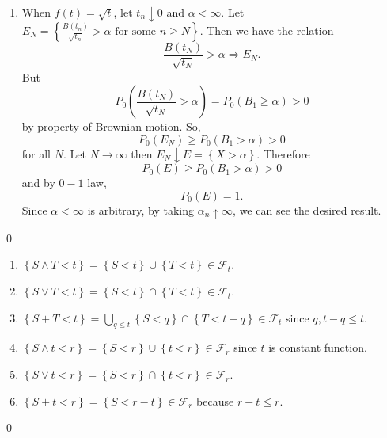 \begin{problem}[7.2.4]
\begin{enumerate}
\item When $f(t) = \sqrt{t}$, let $t_n \downarrow 0$ and $\alpha < \infty$.
	Let $E_N = \left\{ \frac{B(t_n)}{\sqrt{t_n}} > \alpha \text{ for some } n \ge N \right\}$.
	Then we have the relation
	\[
		\frac{B(t_N)}{\sqrt{t_N}} > \alpha \Rightarrow E_N.
	\]
	But
	\[
		P_0\left( \frac{B(t_N)}{\sqrt{t_N}} > \alpha \right)
		= P_0\left( B_1 \ge \alpha \right) > 0
	\]
	by property of Brownian motion.
	So,
	\[
		P_0(E_N) \ge P_0(B_1 > \alpha) > 0
	\]
	for all $N$.
	Let $N \rightarrow \infty$ then $E_N \downarrow E = \left\{ X > \alpha \right\}$.
	Therefore
	\[
		P_0(E) \ge P_0(B_1 > \alpha) > 0
	\]
	and by $0-1$ law,
	\[
		P_0(E) = 1.
	\]
	Since $\alpha < \infty$ is arbitrary, by taking $\alpha_n \uparrow \infty$, we can see the desired result.
\end{enumerate}

	\qed
\end{problem}

\begin{problem}[7.3.2] \hfill

	\begin{enumerate}
		\item $\left\{ S \wedge T < t \right\} = \left\{ S < t  \right\} \cup \left\{ T < t \right\} \in \mathcal{F}_t$.

		\item $\left\{ S \vee T < t \right\} = \left\{ S < t \right\} \cap \left\{ T < t \right\} \in \mathcal{F}_t$.
	
		\item $\left\{ S + T < t \right \} = \bigcup_{q \le t} \left\{ S < q \right\} \cap \left\{ T< t-q \right\} \in \mathcal{F}_t$ since $q , t-q \le t$.

		\item $\left\{ S \wedge t < r \right\} = \left\{ S < r \right\} \cup \left\{ t < r \right\} \in \mathcal{F}_r$ since $t$ is constant function.

		\item $\left\{ S \vee t < r \right\} = \left\{ S < r \right\} \cap \left\{ t < r \right\} \in \mathcal{F}_r$.

		\item $\left\{ S + t < r \right\} = \left\{ S < r-t \right\} \in \mathcal{F}_r$ because $r-t \le r$.
	\end{enumerate}

	\qed
\end{problem}

